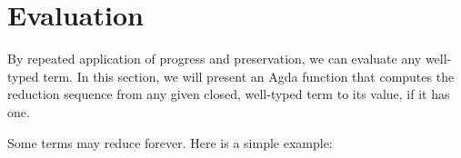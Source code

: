 \hypertarget{evaluation}{%
\section{Evaluation}\label{evaluation}}

By repeated application of progress and preservation, we can evaluate
any well-typed term. In this section, we will present an Agda function
that computes the reduction sequence from any given closed, well-typed
term to its value, if it has one.

Some terms may reduce forever. Here is a simple example:

\begin{fence}
\begin{code}%
\>[0]%
\>[6]\AgdaSymbol{=}%
\>[9]\AgdaSpace{}%
\AgdaSpace{}%
\AgdaSpace{}%
\AgdaSpace{}%
\AgdaSymbol{(}\AgdaSpace{}%
\AgdaSymbol{)}\<%
\\
%
\\[\AgdaEmptyExtraSkip]%
\>[0]\AgdaFunction{\AgdaUnderscore{}}%
\>[976I]\AgdaSymbol{=}\<%
\\
\>[.][@{}l@{}]\<[976I]%
\>[2]\<%
\\
\>[2][@{}l@{\AgdaIndent{0}}]%
\>[4]\<%
\\
%
\>[2]\AgdaSpace{}%
\AgdaSpace{}%
\<%
\\
\>[2][@{}l@{\AgdaIndent{0}}]%
\>[4]\AgdaSpace{}%
\<%
\\
%
\>[2]\AgdaSpace{}%
\AgdaSpace{}%
\AgdaSpace{}%
\<%
\\
\>[2][@{}l@{\AgdaIndent{0}}]%
\>[4]\AgdaSpace{}%
\AgdaSpace{}%
\<%
\\
%
\>[2]\AgdaSpace{}%
\AgdaSpace{}%
\AgdaSymbol{(}\AgdaSpace{}%
\AgdaSymbol{)}\AgdaSpace{}%
\<%
\\
\>[2][@{}l@{\AgdaIndent{0}}]%
\>[4]\AgdaSpace{}%
\AgdaSpace{}%
\AgdaSpace{}%
\<%
\\
%
\>[2]\<%
\\
%
\>[2]\<%
\end{code}
\end{fence}

